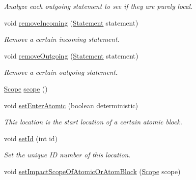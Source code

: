 \begin{DoxyCompactItemize}
\begin{DoxyCompactList}\small\item\em Analyze each outgoing statement to see if they are purely local. \end{DoxyCompactList}\item 
void \hyperlink{classedu_1_1udel_1_1cis_1_1vsl_1_1civl_1_1model_1_1common_1_1location_1_1CommonLocation_ad16a97802b8f06f1280f6c39a44f291f}{remove\+Incoming} (\hyperlink{interfaceedu_1_1udel_1_1cis_1_1vsl_1_1civl_1_1model_1_1IF_1_1statement_1_1Statement}{Statement} statement)
\begin{DoxyCompactList}\small\item\em Remove a certain incoming statement. \end{DoxyCompactList}\item 
void \hyperlink{classedu_1_1udel_1_1cis_1_1vsl_1_1civl_1_1model_1_1common_1_1location_1_1CommonLocation_ab668666d935735b701d0f1a2feb40db4}{remove\+Outgoing} (\hyperlink{interfaceedu_1_1udel_1_1cis_1_1vsl_1_1civl_1_1model_1_1IF_1_1statement_1_1Statement}{Statement} statement)
\begin{DoxyCompactList}\small\item\em Remove a certain outgoing statement. \end{DoxyCompactList}\item 
\hyperlink{interfaceedu_1_1udel_1_1cis_1_1vsl_1_1civl_1_1model_1_1IF_1_1Scope}{Scope} \hyperlink{classedu_1_1udel_1_1cis_1_1vsl_1_1civl_1_1model_1_1common_1_1location_1_1CommonLocation_ab302fa89ee21cc56cb1c8efc621882da}{scope} ()
\item 
void \hyperlink{classedu_1_1udel_1_1cis_1_1vsl_1_1civl_1_1model_1_1common_1_1location_1_1CommonLocation_ae2c8077b17cedb0356fe3ff587a043a6}{set\+Enter\+Atomic} (boolean deterministic)
\begin{DoxyCompactList}\small\item\em This location is the start location of a certain atomic block. \end{DoxyCompactList}\item 
void \hyperlink{classedu_1_1udel_1_1cis_1_1vsl_1_1civl_1_1model_1_1common_1_1location_1_1CommonLocation_abf0cbacbc6b111bccef321576caa8130}{set\+Id} (int id)
\begin{DoxyCompactList}\small\item\em Set the unique I\+D number of this location. \end{DoxyCompactList}\item 
void \hyperlink{classedu_1_1udel_1_1cis_1_1vsl_1_1civl_1_1model_1_1common_1_1location_1_1CommonLocation_ab453c4a8a8de4c5e5376d56811ee242e}{set\+Impact\+Scope\+Of\+Atomic\+Or\+Atom\+Block} (\hyperlink{interfaceedu_1_1udel_1_1cis_1_1vsl_1_1civl_1_1model_1_1IF_1_1Scope}{Scope} scope)

\end{DoxyCompactItemize}
